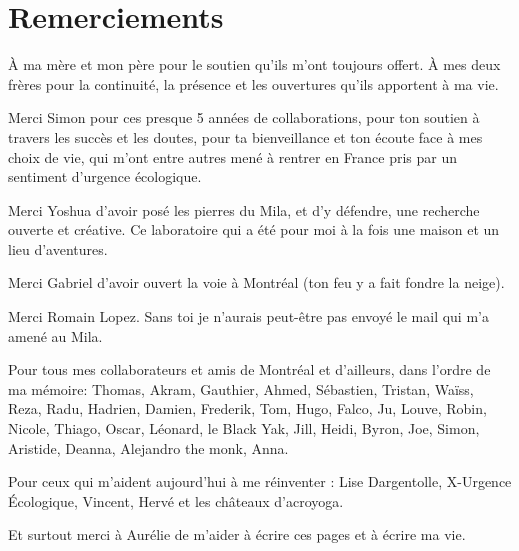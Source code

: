 \documentclass[12pt]{report} %
\numberwithin{equation}{chapter}
\numberwithin{table}{chapter}
\numberwithin{figure}{chapter}
\begin{document}

\chapter*{Remerciements}

À ma mère et mon père pour le soutien qu'ils m'ont toujours offert.
À mes deux frères pour la continuité, la présence et les ouvertures qu'ils apportent à ma vie.

Merci Simon pour ces presque 5 années de collaborations,
pour ton soutien à travers les succès et les doutes,
pour ta bienveillance et ton écoute face à mes choix de vie, qui m'ont entre autres mené à rentrer en France pris par un sentiment d'urgence écologique.

Merci Yoshua d'avoir posé les pierres du Mila, et d'y défendre, une recherche ouverte et créative.
Ce laboratoire qui a été pour moi à la fois une maison et un lieu d'aventures.

Merci Gabriel d'avoir ouvert la voie à Montréal (ton feu y a fait fondre la neige).

Merci Romain Lopez. Sans toi je n'aurais peut-être pas envoyé le mail qui m'a amené au Mila.

Pour tous mes collaborateurs et amis de Montréal et d'ailleurs, dans l'ordre de ma mémoire:
Thomas, Akram, Gauthier, Ahmed, Sébastien, Tristan, Waïss, Reza, Radu, Hadrien,  Damien, Frederik, Tom, Hugo, Falco, Ju, Louve, Robin, Nicole, Thiago, Oscar, Léonard, le Black Yak, Jill, Heidi, Byron, Joe, Simon, Aristide, Deanna, Alejandro the monk, Anna.

Pour ceux qui m'aident aujourd'hui à me réinventer : Lise Dargentolle, X-Urgence Écologique, Vincent, Hervé et les châteaux d'acroyoga.

Et surtout merci à Aurélie de m'aider à écrire ces pages et à écrire ma vie.

\cleardoublepage

%
\end{document}
